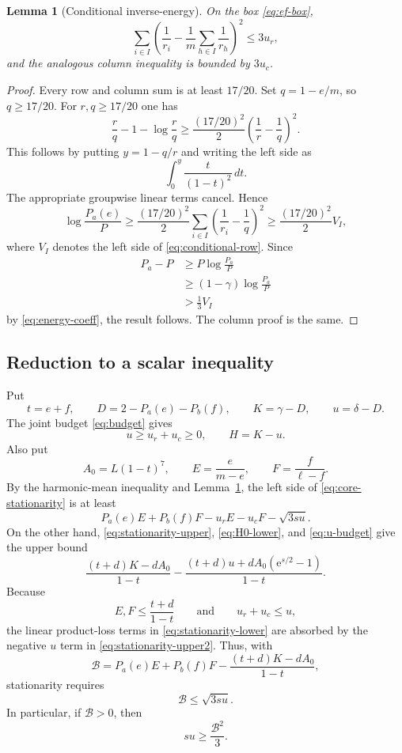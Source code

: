\documentclass[11pt]{article}
\newtheorem{lemma}[theorem]{Lemma}
\theoremstyle{definition}
\newcommand{\e}{\mathrm e}
\begin{document}
\begin{lemma}[Conditional inverse-energy]\label{lem:conditional-energy}
On the box \eqref{eq:ef-box},
\[
 \sum_{i\in I}\left(
 \frac1{r_i}-\frac1m\sum_{h\in I}\frac1{r_h}
 \right)^2\le3u_r,
 \tag{5.7}\label{eq:conditional-row}
\]
and the analogous column inequality is bounded by $3u_c$.
\end{lemma}

\begin{proof}
Every row and column sum is at least $17/20$.  Set $q=1-e/m$, so $q\ge17/20$.  For $r,q\ge17/20$ one has
\[
 \frac rq-1-\log\frac rq
 \ge\frac{(17/20)^2}{2}
       \left(\frac1r-\frac1q\right)^2.
 \tag{5.8}\label{eq:group-scalar}
\]
This follows by putting $y=1-q/r$ and writing the left side as
\[
 \int_0^y\frac{t}{(1-t)^2}\,dt.
\]
The appropriate groupwise linear terms cancel.  Hence
\[
 \log\frac{P_a(e)}P
 \ge\frac{(17/20)^2}{2}
 \sum_{i\in I}\left(\frac1{r_i}-\frac1q\right)^2
 \ge\frac{(17/20)^2}{2}V_I,
\]
where $V_I$ denotes the left side of \eqref{eq:conditional-row}.  Since
\[
 \begin{aligned}
 P_a-P
 &\ge P\log\frac{P_a}{P}\\
 &\ge(1-\gamma)\log\frac{P_a}{P}\\
 &>\frac13V_I
 \end{aligned}
\]
by \eqref{eq:energy-coeff}, the result follows.  The column proof is the same.
\end{proof}

\subsection{Reduction to a scalar inequality}

Put
\[
 t=e+f,
 \qquad
 D=2-P_a(e)-P_b(f),
 \qquad
 K=\gamma-D,
 \qquad
 u=\delta-D.
 \tag{5.9}\label{eq:K-u}
\]
The joint budget \eqref{eq:budget} gives
\[
 u\ge u_r+u_c\ge0,
 \qquad H=K-u.
 \tag{5.10}\label{eq:u-budget}
\]
Also put
\[
 A_0=L(1-t)^7,
 \qquad
 E=\frac e{m-e},
 \qquad
 F=\frac f{\ell-f}.
 \tag{5.11}\label{eq:A0EF}
\]
By the harmonic-mean inequality and Lemma~\ref{lem:conditional-energy}, the left side of \eqref{eq:core-stationarity} is at least
\[
 P_a(e)E+P_b(f)F-u_rE-u_cF-\sqrt{3su}.
 \tag{5.12}\label{eq:stationarity-lower}
\]
On the other hand, \eqref{eq:stationarity-upper}, \eqref{eq:H0-lower}, and \eqref{eq:u-budget} give the upper bound
\[
 \frac{(t+d)K-dA_0}{1-t}
 -\frac{(t+d)u+dA_0(\e^{s/2}-1)}{1-t}.
 \tag{5.13}\label{eq:stationarity-upper2}
\]
Because
\[
 E,F\le\frac{t+d}{1-t}
 \qquad\text{and}\qquad u_r+u_c\le u,
\]
the linear product-loss terms in \eqref{eq:stationarity-lower} are absorbed by the negative $u$ term in \eqref{eq:stationarity-upper2}.  Thus, with
\[
 \mathcal B=
 P_a(e)E+P_b(f)F
 -\frac{(t+d)K-dA_0}{1-t},
 \tag{5.14}\label{eq:Bscalar}
\]
stationarity requires
\[
 \mathcal B\le\sqrt{3su}.
 \tag{5.15}\label{eq:Benergy}
\]
In particular, if $\mathcal B>0$, then
\[
 su\ge\frac{\mathcal B^2}{3}.
 \tag{5.16}\label{eq:su-lower}
\]
\end{document}
